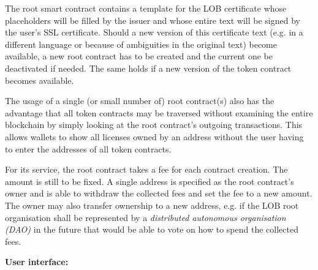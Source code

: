 \documentclass[a4paper]{article}
\begin{document}
The root smart contract contains a template for the LOB certificate whose placeholders will be filled by the issuer and whose entire text will be signed by the user's SSL certificate. Should a new version of this certificate text (e.g. in a different language or because of ambiguities in the original text) become available, a new root contract has to be created and the current one be deactivated if needed. The same holds if a new version of the token contract becomes available.

The usage of a single (or small number of) root contract(s) also has the advantage that all token contracts may be traversed without examining the entire blockchain by simply looking at the root contract's outgoing transactions. This allows wallets to show all licenses owned by an address without the user having to enter the addresses of all token contracts.

For its service, the root contract takes a fee for each contract creation. The amount is still to be fixed. 
A single address is specified as the root contract's owner and is able to withdraw the collected fees and set the fee to a new amount. The owner may also transfer ownership to a new address, e.g. if the LOB root organisation shall be represented by a \emph{distributed autonomous organisation (DAO)} in the future that would be able to vote on how to spend the collected fees.

\textbf{User interface:}
\end{document}
